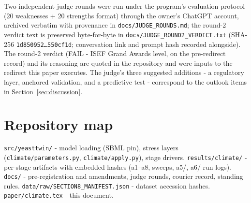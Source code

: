 \documentclass[12pt]{article}
\begin{document}
Two independent-judge rounds were run under the program's evaluation
protocol (20 weaknesses + 20 strengths format) through the owner's
ChatGPT account, archived verbatim with provenance in
\texttt{docs/JUDGE\_ROUNDS.md}; the round-2 verdict text is preserved
byte-for-byte in \texttt{docs/JUDGE\_ROUND2\_VERDICT.txt}
(SHA-256 \texttt{1d850952\ldots550cf1d}; conversation link and prompt
hash recorded alongside). The round-2 verdict (FAIL - ISEF Grand Awards
level, on the pre-redirect record) and its reasoning are quoted in the
repository and were inputs to the redirect this paper executes. The
judge's three suggested additions - a regulatory layer, anchored
validation, and a predictive test - correspond to the outlook items in
Section~\ref{sec:discussion}.

\section{Repository map}
\label{app:repo}

\texttt{src/yeasttwin/} - model loading (SBML pin), stress layers
(\texttt{climate/parameters.py}, \texttt{climate/apply.py}), stage
drivers. \texttt{results/climate/} - per-stage artifacts with embedded
hashes (a1--a8, sweeps, a5/, a6/ run logs). \texttt{docs/} -
pre-registration and amendments, judge rounds, courier record, standing
rules. \texttt{data/raw/SECTION8\_MANIFEST.json} - dataset accession
hashes. \texttt{paper/climate.tex} - this document.
\end{document}
